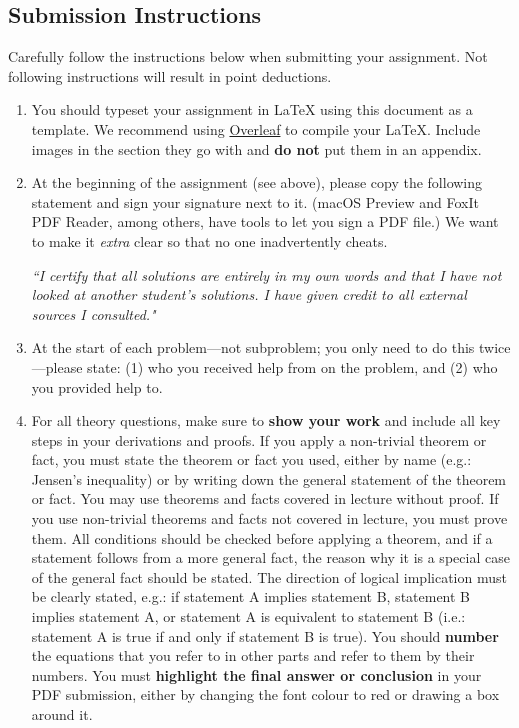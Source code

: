 \documentclass[10pt]{article}
\begin{document}
\subsection*{Submission Instructions}
Carefully follow the instructions below when submitting your assignment. Not following instructions will result in point deductions. 

\begin{enumerate}
    \item You should typeset your assignment in LaTeX using this document as a template. We recommend using \href{https://www.overleaf.com/}{Overleaf} to compile your LaTeX. Include images in the section they go with and \textbf{do not} put them in an appendix.
    \item At the beginning of the assignment (see above), please copy the following statement and sign your signature next to it. (macOS Preview and FoxIt PDF Reader, among others, have tools to let you sign a PDF file.) We want to make it \textit{extra} clear so that no one inadvertently cheats.
    \begin{center}\textit{``I certify that all solutions are entirely in my own words and that I have not looked at another student's solutions. I have given credit to all external sources I consulted."}\end{center}
    \item At the start of each problem---not subproblem; you only need to do this twice---please state: (1) who you received help from on the problem, and (2) who you provided help to. 
    \item For all theory questions, make sure to \textbf{show  your work} and include all key steps in your derivations and proofs. If you apply a non-trivial theorem or fact, you must state the theorem or fact you used, either by name (e.g.: Jensen's inequality) or by writing down the general statement of the theorem or fact. You may use theorems and facts covered in lecture without proof. If you use non-trivial theorems and facts not covered in lecture, you must prove them. All conditions should be checked before applying a theorem, and if a statement follows from a more general fact, the reason why it is a special case of the general fact should be stated. The direction of logical implication must be clearly stated, e.g.: if statement A implies statement B, statement B implies statement A, or statement A is equivalent to statement B (i.e.: statement A is true if and only if statement B is true). You should \textbf{number} the equations that you refer to in other parts and refer to them by their numbers. You must \textbf{highlight the final answer or conclusion} in your PDF submission, either by changing the font colour to red or drawing a box around it. 

\end{enumerate}
\end{document}
